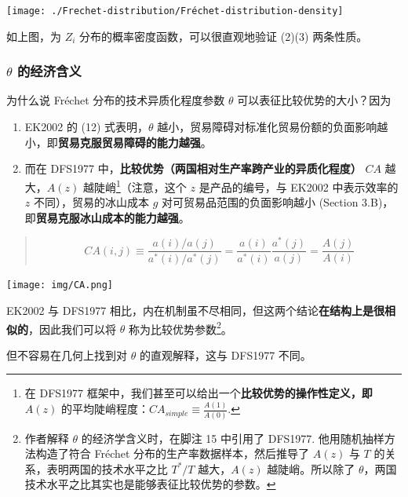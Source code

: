 \documentclass[
]{article}
\providecommand{\tightlist}{%
  \setlength{\itemsep}{0pt}\setlength{\parskip}{0pt}}
\begin{document}
\begin{center}\texttt{[image: ./Frechet-distribution/Fréchet-distribution-density]} \end{center}

如上图，为 \(Z_i\)
分布的概率密度函数，可以很直观地验证 (2)(3) 两条性质。

\hypertarget{theta-ux7684ux7ecfux6d4eux542bux4e49}{%
\subsubsection{\texorpdfstring{\(\theta\) 的经济含义}{\textbackslash theta 的经济含义}}\label{theta-ux7684ux7ecfux6d4eux542bux4e49}}

为什么说 Fréchet 分布的技术异质化程度参数 \(\theta\) 可以表征比较优势的大小？因为

\begin{enumerate}
\def\labelenumi{\arabic{enumi}.}
\tightlist
\item
  EK2002 的 (12) 式表明，\(\theta\) 越小，贸易障碍对标准化贸易份额的负面影响越小，即\textbf{贸易克服贸易障碍的能力越强}。
\item
  而在 DFS1977 中，\textbf{比较优势（两国相对生产率跨产业的异质化程度）} \(CA\) 越大，\(A(z)\) 越陡峭\footnote{在 DFS1977 框架中，我们甚至可以给出一个\textbf{比较优势的操作性定义，即} \(A(z)\) 的平均陡峭程度：\(CA_{simple} \equiv \frac{A(1)}{A(0)}\).}（注意，这个 \(z\) 是产品的编号，与 EK2002 中表示效率的 \(z\) 不同），贸易的冰山成本 \(g\) 对可贸易品范围的负面影响越小 (Section 3.B)，即\textbf{贸易克服冰山成本的能力越强}。
\end{enumerate}

\begin{quote}
\[
CA(i,j) \equiv \frac{a(i)/a(j)}{a^\ast(i)/a^\ast(j)}=\frac{a(i)}{a^\ast(i)}\frac{a^\ast(j)}{a(j)}=\frac{A(j)}{A(i)}
\]
\end{quote}

\texttt{[image: img/CA.png]}

EK2002 与 DFS1977 相比，内在机制虽不尽相同，但这两个结论\textbf{在结构上是很相似的}，因此我们可以将 \(\theta\) 称为比较优势参数\footnote{作者解释 \(\theta\) 的经济学含义时，在脚注 15 中引用了 DFS1977. 他用随机抽样方法构造了符合 Fréchet 分布的生产率数据样本，然后推导了 \(A(z)\) 与 \(T\) 的关系，表明两国的技术水平之比 \(T^\ast/T\) 越大，\(A(z)\) 越陡峭。所以除了 \(\theta\)，两国技术水平之比其实也是能够表征比较优势的参数。}。

但不容易在几何上找到对 \(\theta\) 的直观解释，这与 DFS1977 不同。
\end{document}
